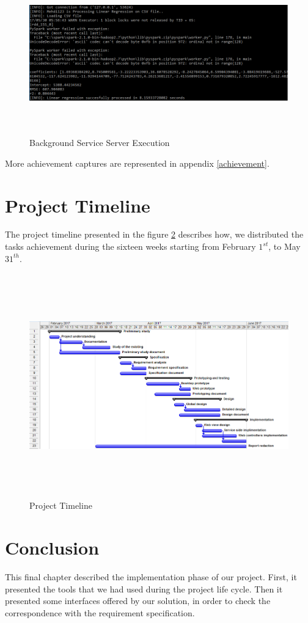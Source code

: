 \begin{figure}[H]
\begin{center}
\includegraphics[width=17cm,height=7cm]{chapter5/work.png}
\end{center}
\caption{Background Service Server Execution}
\label{work}
\end{figure}
More achievement captures are represented in appendix \ref{achievement}.
\newpage


\section{Project Timeline}
The project timeline presented in the figure \ref{plan} describes how, we distributed the tasks achievement
during the sixteen weeks starting from February $1^{st}$, to May $31^{th}$.
\begin{figure}[H]
\begin{center}
\includegraphics[width=17cm,height=9.7cm]{chapter5/plan.png}
\end{center}
\caption{Project Timeline}
\label{plan}
\end{figure}
\section*{Conclusion}
This final chapter described the implementation phase of our project. First, it presented the tools that we had used during the project life cycle. Then it presented some interfaces offered by our solution, in order to check the correspondence with the requirement specification.